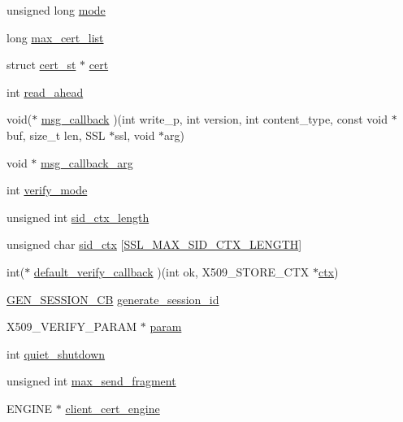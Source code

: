 \begin{DoxyCompactItemize}
unsigned long \hyperlink{structssl__ctx__st_a15675b65ff5a91cc12c75247cec9c90e}{mode}
\item 
long \hyperlink{structssl__ctx__st_a7ee4c1615f56a2034547f06d040613df}{max\-\_\-cert\-\_\-list}
\item 
struct \hyperlink{structcert__st}{cert\-\_\-st} $\ast$ \hyperlink{structssl__ctx__st_a12fd74ab996b83c38cd73136a1163471}{cert}
\item 
int \hyperlink{structssl__ctx__st_a454cbb1294b6b36ab36cff39c541ba70}{read\-\_\-ahead}
\item 
void($\ast$ \hyperlink{structssl__ctx__st_ad1c45e5a8d465d42f89a9f0d4a991dcd}{msg\-\_\-callback} )(int write\-\_\-p, int version, int content\-\_\-type, const void $\ast$buf, size\-\_\-t len, S\-S\-L $\ast$ssl, void $\ast$arg)
\item 
void $\ast$ \hyperlink{structssl__ctx__st_ad1aba043a97ea40fcb8a39e65698f8c0}{msg\-\_\-callback\-\_\-arg}
\item 
int \hyperlink{structssl__ctx__st_a31f82e30439244c12f51daff24fd40d8}{verify\-\_\-mode}
\item 
unsigned int \hyperlink{structssl__ctx__st_a59afab8285fbc901d590ab6edaa75bd0}{sid\-\_\-ctx\-\_\-length}
\item 
unsigned char \hyperlink{structssl__ctx__st_a92f94c2a4612e04ec3c075c76aae5553}{sid\-\_\-ctx} \mbox{[}\hyperlink{ssl_8h_a5cef804495c6414283f4f29d4cea0dd0}{S\-S\-L\-\_\-\-M\-A\-X\-\_\-\-S\-I\-D\-\_\-\-C\-T\-X\-\_\-\-L\-E\-N\-G\-T\-H}\mbox{]}
\item 
int($\ast$ \hyperlink{structssl__ctx__st_a60a59026ec7843603b54dbda1d46ba10}{default\-\_\-verify\-\_\-callback} )(int ok, X509\-\_\-\-S\-T\-O\-R\-E\-\_\-\-C\-T\-X $\ast$\hyperlink{client_8c_ad5433bcc8a463fb4df3ce5912bb11fe3}{ctx})
\item 
\hyperlink{ssl_8h_aa01dfe50fd8d7cc799cad6bcf13ccfbe}{G\-E\-N\-\_\-\-S\-E\-S\-S\-I\-O\-N\-\_\-\-C\-B} \hyperlink{structssl__ctx__st_a4485f799f50830d69fa26e7514b032dc}{generate\-\_\-session\-\_\-id}
\item 
X509\-\_\-\-V\-E\-R\-I\-F\-Y\-\_\-\-P\-A\-R\-A\-M $\ast$ \hyperlink{structssl__ctx__st_a27c15c2ea4e216baacb44a5bf166cfa1}{param}
\item 
int \hyperlink{structssl__ctx__st_a325f28f265dae1b20da7c813e41bdb96}{quiet\-\_\-shutdown}
\item 
unsigned int \hyperlink{structssl__ctx__st_aab1f54a0e69246d749a6f6ad249c2176}{max\-\_\-send\-\_\-fragment}
\item 
E\-N\-G\-I\-N\-E $\ast$ \hyperlink{structssl__ctx__st_ae6bb617a63017d5c8e7eccc6f8030185}{client\-\_\-cert\-\_\-engine}

\end{DoxyCompactItemize}
